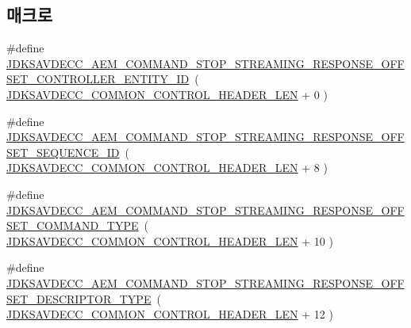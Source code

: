 \subsection*{매크로}
\begin{DoxyCompactItemize}
\item 
\#define \hyperlink{group__command__stop__streaming__response_ga80d8eaae9062b77861cc54cb7210fc77}{J\+D\+K\+S\+A\+V\+D\+E\+C\+C\+\_\+\+A\+E\+M\+\_\+\+C\+O\+M\+M\+A\+N\+D\+\_\+\+S\+T\+O\+P\+\_\+\+S\+T\+R\+E\+A\+M\+I\+N\+G\+\_\+\+R\+E\+S\+P\+O\+N\+S\+E\+\_\+\+O\+F\+F\+S\+E\+T\+\_\+\+C\+O\+N\+T\+R\+O\+L\+L\+E\+R\+\_\+\+E\+N\+T\+I\+T\+Y\+\_\+\+ID}~( \hyperlink{group__jdksavdecc__avtp__common__control__header_gaae84052886fb1bb42f3bc5f85b741dff}{J\+D\+K\+S\+A\+V\+D\+E\+C\+C\+\_\+\+C\+O\+M\+M\+O\+N\+\_\+\+C\+O\+N\+T\+R\+O\+L\+\_\+\+H\+E\+A\+D\+E\+R\+\_\+\+L\+EN} + 0 )
\item 
\#define \hyperlink{group__command__stop__streaming__response_gad024dc8ff5ba4739521357b712e53e7c}{J\+D\+K\+S\+A\+V\+D\+E\+C\+C\+\_\+\+A\+E\+M\+\_\+\+C\+O\+M\+M\+A\+N\+D\+\_\+\+S\+T\+O\+P\+\_\+\+S\+T\+R\+E\+A\+M\+I\+N\+G\+\_\+\+R\+E\+S\+P\+O\+N\+S\+E\+\_\+\+O\+F\+F\+S\+E\+T\+\_\+\+S\+E\+Q\+U\+E\+N\+C\+E\+\_\+\+ID}~( \hyperlink{group__jdksavdecc__avtp__common__control__header_gaae84052886fb1bb42f3bc5f85b741dff}{J\+D\+K\+S\+A\+V\+D\+E\+C\+C\+\_\+\+C\+O\+M\+M\+O\+N\+\_\+\+C\+O\+N\+T\+R\+O\+L\+\_\+\+H\+E\+A\+D\+E\+R\+\_\+\+L\+EN} + 8 )
\item 
\#define \hyperlink{group__command__stop__streaming__response_ga11effb4daecab95654b77d59ff356f38}{J\+D\+K\+S\+A\+V\+D\+E\+C\+C\+\_\+\+A\+E\+M\+\_\+\+C\+O\+M\+M\+A\+N\+D\+\_\+\+S\+T\+O\+P\+\_\+\+S\+T\+R\+E\+A\+M\+I\+N\+G\+\_\+\+R\+E\+S\+P\+O\+N\+S\+E\+\_\+\+O\+F\+F\+S\+E\+T\+\_\+\+C\+O\+M\+M\+A\+N\+D\+\_\+\+T\+Y\+PE}~( \hyperlink{group__jdksavdecc__avtp__common__control__header_gaae84052886fb1bb42f3bc5f85b741dff}{J\+D\+K\+S\+A\+V\+D\+E\+C\+C\+\_\+\+C\+O\+M\+M\+O\+N\+\_\+\+C\+O\+N\+T\+R\+O\+L\+\_\+\+H\+E\+A\+D\+E\+R\+\_\+\+L\+EN} + 10 )
\item 
\#define \hyperlink{group__command__stop__streaming__response_ga2362d1ec1d35a7924cb6168317281084}{J\+D\+K\+S\+A\+V\+D\+E\+C\+C\+\_\+\+A\+E\+M\+\_\+\+C\+O\+M\+M\+A\+N\+D\+\_\+\+S\+T\+O\+P\+\_\+\+S\+T\+R\+E\+A\+M\+I\+N\+G\+\_\+\+R\+E\+S\+P\+O\+N\+S\+E\+\_\+\+O\+F\+F\+S\+E\+T\+\_\+\+D\+E\+S\+C\+R\+I\+P\+T\+O\+R\+\_\+\+T\+Y\+PE}~( \hyperlink{group__jdksavdecc__avtp__common__control__header_gaae84052886fb1bb42f3bc5f85b741dff}{J\+D\+K\+S\+A\+V\+D\+E\+C\+C\+\_\+\+C\+O\+M\+M\+O\+N\+\_\+\+C\+O\+N\+T\+R\+O\+L\+\_\+\+H\+E\+A\+D\+E\+R\+\_\+\+L\+EN} + 12 )

\end{DoxyCompactItemize}
